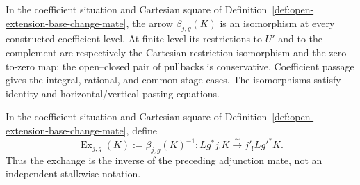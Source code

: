 
\begin{proposition}
\label{prop:open-extension-base-change}


In the coefficient situation and Cartesian square of
Definition~\ref{def:open-extension-base-change-mate}, the arrow
\(\beta_{j,g}(K)\) is an isomorphism at every constructed
coefficient level.  At finite level its restrictions to \(U'\) and to the
complement are respectively the Cartesian restriction isomorphism and the
zero-to-zero map; the open--closed pair of pullbacks is conservative.
Coefficient passage gives the integral, rational, and common-stage cases.
The isomorphisms satisfy identity and horizontal/vertical pasting equations.
\end{proposition}



\begin{definition}
\label{def:open-extension-exchange}


In the coefficient situation and Cartesian square of
Definition~\ref{def:open-extension-base-change-mate}, define
\[
 \operatorname{Ex}_{j,g}(K):=\beta_{j,g}(K)^{-1}:
 Lg^*j_!K\xrightarrow{\sim}j'_!Lg'^*K.
\]
Thus the exchange is the inverse of the preceding adjunction mate, not an
independent stalkwise notation.
\end{definition}



